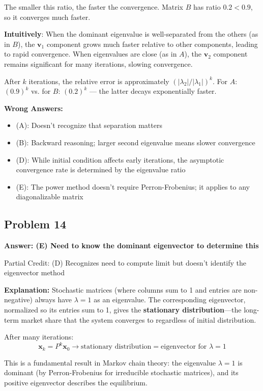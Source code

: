 \documentclass[12pt]{amsart}
\newcommand{\correct}[1]{{\color{correctgreen}\textbf{#1}}}
\newcommand{\partcred}[1]{{\color{partialblue}#1}}
\begin{document}
The smaller this ratio, the faster the convergence. Matrix $B$ has ratio $0.2 < 0.9$, so it converges much faster.

\textbf{Intuitively}: When the dominant eigenvalue is well-separated from the others (as in $B$), the $\mathbf{v}_1$ component grows much faster relative to other components, leading to rapid convergence. When eigenvalues are close (as in $A$), the $\mathbf{v}_2$ component remains significant for many iterations, slowing convergence.

After $k$ iterations, the relative error is approximately $(|\lambda_2|/|\lambda_1|)^k$. For $A$: $(0.9)^k$ vs. for $B$: $(0.2)^k$ — the latter decays exponentially faster.

\textbf{Wrong Answers:}
\begin{itemize}
\item (A): Doesn't recognize that separation matters
\item (B): Backward reasoning; larger second eigenvalue means slower convergence
\item (D): While initial condition affects early iterations, the asymptotic convergence rate is determined by the eigenvalue ratio
\item (E): The power method doesn't require Perron-Frobenius; it applies to any diagonalizable matrix
\end{itemize}

\subsection*{Problem 14}
\correct{Answer: (E) Need to know the dominant eigenvector to determine this}

\partcred{Partial Credit: (D) Recognizes need to compute limit but doesn't identify the eigenvector method}

\textbf{Explanation:} Stochastic matrices (where columns sum to 1 and entries are non-negative) always have $\lambda = 1$ as an eigenvalue. The corresponding eigenvector, normalized so its entries sum to 1, gives the \textbf{stationary distribution}—the long-term market share that the system converges to regardless of initial distribution.

After many iterations:
$$\mathbf{x}_k = P^k\mathbf{x}_0 \to \text{stationary distribution} = \text{eigenvector for } \lambda = 1$$

This is a fundamental result in Markov chain theory: the eigenvalue $\lambda = 1$ is dominant (by Perron-Frobenius for irreducible stochastic matrices), and its positive eigenvector describes the equilibrium.
\end{document}
